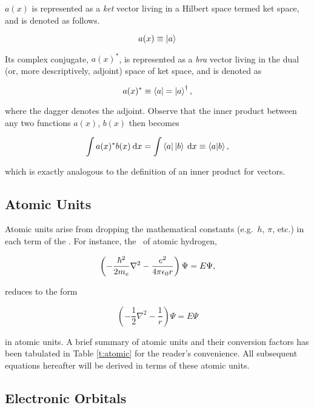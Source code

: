 $a(x)$ is represented as a \emph{ket} vector living in a Hilbert space termed
ket space, and is denoted as follows.

\begin{equation}
	a(x) \equiv \ket{a}
\end{equation}

Its complex conjugate, $a(x)^*$, is represented as a \emph{bra} vector living in
the dual (or, more descriptively, adjoint) space of ket space, and is denoted as

\begin{equation}
	a(x)^* \equiv \bra{a} = \ket{a}^\dagger,
\end{equation}

\noindent where the dagger denotes the adjoint. Observe that the inner product
between any two functions $a(x)$, $b(x)$ then becomes

\begin{equation}
	\int a(x)^* b(x) \:\mathrm{d} x = \int \bra{a} \ket{b} \:\mathrm{d} x \equiv \braket{a|b},
\end{equation}

\noindent which is exactly analogous to the definition of an inner product for
vectors.

\subsection{Atomic Units}

Atomic units arise from dropping the mathematical constants (e.g.\ $h$, $\pi$,
etc.) in each term of the \SE. For instance, the \SE\ of atomic hydrogen,

\begin{equation}
	\left(
	- \frac{\hbar^2}{2 m_e} \nabla^2
	- \frac{e^2}{4 \pi \epsilon_0 r}
	\right)
	\Psi = E \Psi,
\end{equation}

\noindent reduces to the form

\begin{equation}
	\left(
	- \frac{1}{2} \nabla^2
	- \frac{1}{r}
	\right)
	\Psi = E \Psi
\end{equation}

\noindent in atomic units. A brief summary of atomic units and their conversion
factors has been tabulated in Table \ref{t:atomic} for the reader's convenience.
All subsequent equations hereafter will be derived in terms of these atomic
units.



\subsection{Electronic Orbitals}


